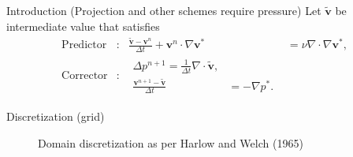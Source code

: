 \documentclass{beamer}
\begin{document}
  \begin{frame}{Introduction (Projection and other schemes require pressure)}
  Let $\tilde{\boldsymbol{v}}$ be intermediate value that satisfies
	\begin{align}
	\label{eqn:predictor}
	\text{Predictor}&: & \frac{\widetilde{\boldsymbol{v}}-\boldsymbol{v}^{n}}{\Delta t} + \boldsymbol{v}^{n} \cdot \nabla \boldsymbol{v}^{*} &= \nu \nabla \cdot \nabla \boldsymbol{v}^{*}, \\
	\label{eqn:corrector}
	\text{Corrector}&: & 
	\begin{split}
		\Delta p^{n+1}=\frac{1}{\Delta t}\nabla\cdot\boldsymbol{\tilde v},\\
		\frac{\boldsymbol{v}^{n+1}-\widetilde{\boldsymbol{v}}}{\Delta t} &= -\nabla p^{*}.
	\end{split}
	\end{align}
  	
  \end{frame}
  \begin{frame}{Discretization (grid)}
		\begin{figure}[H] %
		\caption{Domain discretization as per Harlow and Welch (1965)}\label{bl-domain-discretization}
		\end{figure}
	\end{frame}
  
  

  
	
\end{document}
